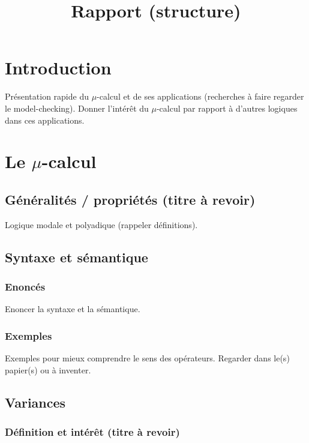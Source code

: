 \documentclass[11pt,a4paper]{article}
\title{Rapport (structure)}
\date{}
\begin{document}
\maketitle

\section*{Introduction}

Présentation rapide du $\mu$-calcul et de ses applications (recherches à faire regarder le model-checking). Donner l'intérêt du $\mu$-calcul par rapport à d'autres logiques dans ces applications.   

\section{Le $\mu$-calcul}

\subsection{Généralités / propriétés (titre à revoir)}

Logique modale et polyadique (rappeler définitions). 

\subsection{Syntaxe et sémantique}

\subsubsection{Enoncés}

Enoncer la syntaxe et la sémantique.

\subsubsection{Exemples}

Exemples pour mieux comprendre le sens des opérateurs. Regarder dans le(s) papier(s) ou à inventer.

\subsection{Variances}

\subsubsection{Définition et intérêt (titre à revoir)}
\end{document}
